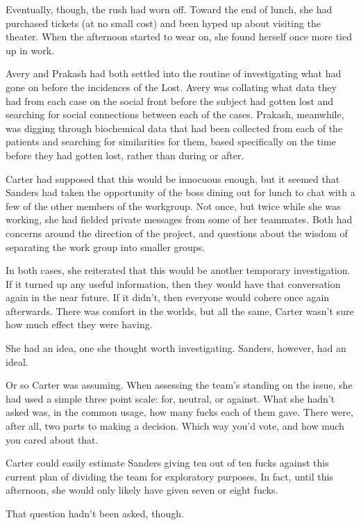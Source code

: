 Eventually, though, the rush had worn off.  Toward the end of lunch, she had purchased tickets (at no small cost) and been hyped up about visiting the theater.  When the afternoon started to wear on, she found herself once more tied up in work.

Avery and Prakash had both settled into the routine of investigating what had gone on before the incidences of the Lost.  Avery was collating what data they had from each case on the social front before the subject had gotten lost and searching for social connections between each of the cases.  Prakash, meanwhile, was digging through biochemical data that had been collected from each of the patients and searching for similarities for them, based specifically on the time before they had gotten lost, rather than during or after.

Carter had supposed that this would be innocuous enough, but it seemed that Sanders had taken the opportunity of the boss dining out for lunch to chat with a few of the other members of the workgroup.  Not once, but twice while she was working, she had fielded private messages from some of her teammates.  Both had concerns around the direction of the project, and questions about the wisdom of separating the work group into smaller groups.

In both cases, she reiterated that this would be another temporary investigation.  If it turned up any useful information, then they would have that conversation again in the near future.  If it didn't, then everyone would cohere once again afterwards.  There was comfort in the worlds, but all the same, Carter wasn't sure how much effect they were having.

She had an idea, one she thought worth investigating.  Sanders, however, had an ideal.

Or so Carter was assuming.  When assessing the team's standing on the issue, she had used a simple three point scale: for, neutral, or against.  What she hadn't asked was, in the common usage, how many fucks each of them gave.  There were, after all, two parts to making a decision.  Which way you'd vote, and how much you cared about that.

Carter could easily estimate Sanders giving ten out of ten fucks against this current plan of dividing the team for exploratory purposes.  In fact, until this afternoon, she would only likely have given seven or eight fucks.

That question hadn't been asked, though.

